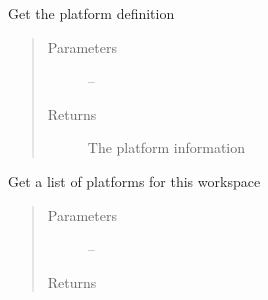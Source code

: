 \documentclass[letterpaper,10pt,english]{sphinxmanual}
\begin{document}

\begin{fulllineitems}
\label{_source/son_editor.impl:son_editor.impl.platformsimpl.get_platform}
Get the platform definition
\begin{quote}\begin{description}
\item[{Parameters}] \leavevmode
{} -- 

\item[{Returns}] \leavevmode
The platform information

\end{description}\end{quote}

\end{fulllineitems}


\begin{fulllineitems}
\label{_source/son_editor.impl:son_editor.impl.platformsimpl.get_platforms}
Get a list of platforms for this workspace
\begin{quote}\begin{description}
\item[{Parameters}] \leavevmode
{} -- 

\item[{Returns}] \leavevmode


\end{description}\end{quote}

\end{fulllineitems}

\end{document}
